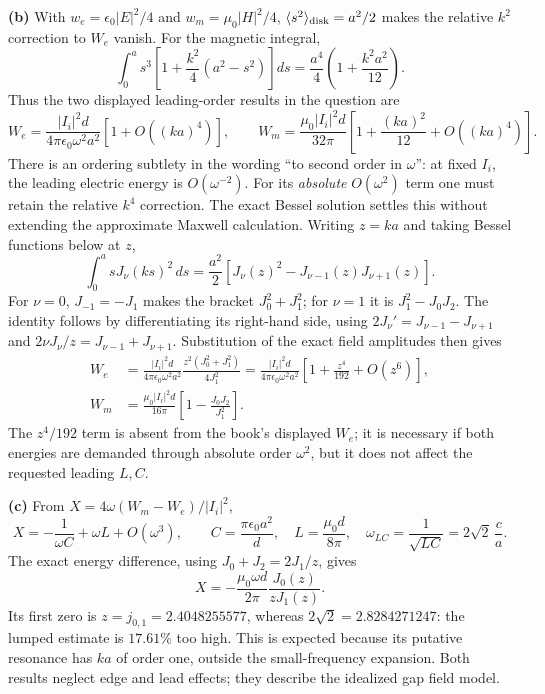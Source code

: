 \textbf{(b)} With $w_e=\epsilon_0|E|^2/4$ and $w_m=\mu_0|H|^2/4$,
$\langle s^2\rangle_{\rm disk}=a^2/2$ makes the relative $k^2$ correction
to $W_e$ vanish. For the magnetic integral,
\[
\int_0^a s^3\left[1+\frac{k^2}{4}(a^2-s^2)\right]ds
=\frac{a^4}{4}\left(1+\frac{k^2a^2}{12}\right).
\]
Thus the two displayed leading-order results in the question are
\[
W_e=\frac{|I_i|^2d}{4\pi\epsilon_0\omega^2a^2}[1+O((ka)^4)],\qquad
W_m=\frac{\mu_0|I_i|^2d}{32\pi}
\left[1+\frac{(ka)^2}{12}+O((ka)^4)\right].
\]
There is an ordering subtlety in the wording ``to second order in
$\omega$'': at fixed $I_i$, the leading electric energy is $O(\omega^{-2})$.
For its \emph{absolute} $O(\omega^2)$ term one must retain the relative
$k^4$ correction. The exact Bessel solution settles this without extending
the approximate Maxwell calculation. Writing $z=ka$ and taking Bessel
functions below at $z$,
\[
\int_0^a sJ_\nu(ks)^2\,ds
=\frac{a^2}{2}\left[J_\nu(z)^2-J_{\nu-1}(z)J_{\nu+1}(z)\right].
\]
For $\nu=0$, $J_{-1}=-J_1$ makes the bracket $J_0^2+J_1^2$;
for $\nu=1$ it is $J_1^2-J_0J_2$. The identity follows by
differentiating its right-hand side, using
$2J_\nu'=J_{\nu-1}-J_{\nu+1}$ and
$2\nu J_\nu/z=J_{\nu-1}+J_{\nu+1}$.
Substitution of the exact field amplitudes then gives
\begin{align*}
W_e&=\frac{|I_i|^2d}{4\pi\epsilon_0\omega^2a^2}
\frac{z^2(J_0^2+J_1^2)}{4J_1^2}
=\frac{|I_i|^2d}{4\pi\epsilon_0\omega^2a^2}
\left[1+\frac{z^4}{192}+O(z^6)\right],\\
W_m&=\frac{\mu_0|I_i|^2d}{16\pi}
\left[1-\frac{J_0J_2}{J_1^2}\right].
\end{align*}
The $z^4/192$ term is absent from the book's displayed $W_e$;
it is necessary if both energies are demanded through absolute order
$\omega^2$, but it does not affect the requested leading $L,C$.

\textbf{(c)} From $X=4\omega(W_m-W_e)/|I_i|^2$,
\[
X=-\frac1{\omega C}+\omega L+O(\omega^3),\qquad
\boxed{C=\frac{\pi\epsilon_0a^2}{d},\quad L=\frac{\mu_0d}{8\pi},\quad
\omega_{LC}=\frac1{\sqrt{LC}}=2\sqrt2\,\frac ca.}
\]
The exact energy difference, using $J_0+J_2=2J_1/z$, gives
\[
X=-\frac{\mu_0\omega d}{2\pi}\frac{J_0(z)}{zJ_1(z)}.
\]
Its first zero is $z=j_{0,1}=2.4048255577$, whereas
$2\sqrt2=2.8284271247$: the lumped estimate is $17.61\%$ too high.
This is expected because its putative resonance has $ka$ of order one,
outside the small-frequency expansion. Both results neglect edge and
lead effects; they describe the idealized gap field model.

